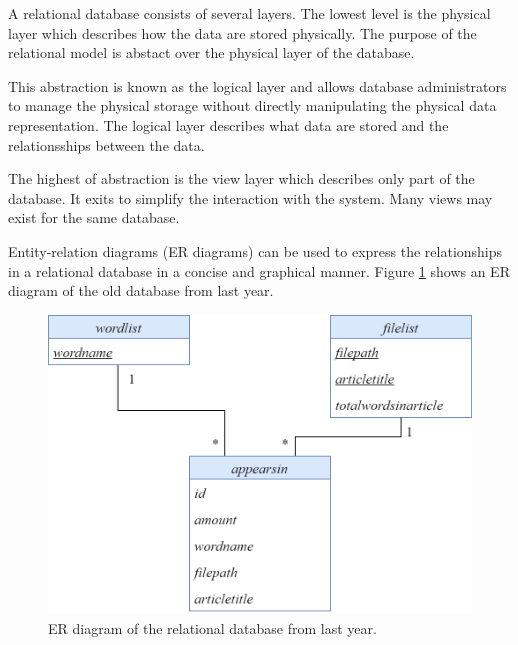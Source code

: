 A relational database consists of several layers.
The lowest level is the physical layer which describes how the data are stored physically.
The purpose of the relational model is abstact over the physical layer of the database.

This abstraction is known as the logical layer and allows database administrators to manage the physical storage without directly manipulating the physical data representation.
The logical layer describes what data are stored and the relationsships between the data.

The highest of abstraction is the view layer which describes only part of the database. It exits to simplify the interaction with the system. Many views may exist for the same database.

Entity-relation diagrams (ER diagrams) can be used to express the relationships in a relational database in a concise and graphical manner.
Figure \ref{olddatabase} shows an ER diagram of the old database from last year.

\begin{figure}[h]
    \centering
    \includegraphics[width=\linewidth]{Images/old wordcount db.PNG}
    \caption{ER diagram of the relational database from last year.}
    \label{olddatabase}
\end{figure}
